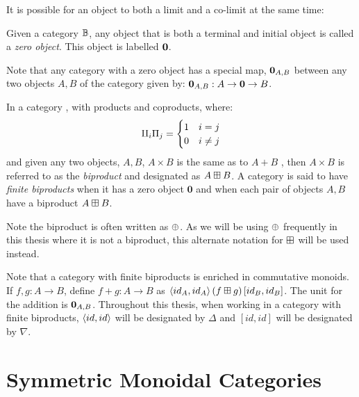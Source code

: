 It is possible for an object to both a limit and a co-limit at the same time:
\begin{definition}\label{def:categorical_zero}
  Given a category $\mathbb{B}$, any object that is both a terminal and initial object is called a
  \emph{zero object}. This object is labelled $\mathbf{0}$.
\end{definition}

Note that any category with a zero object has a special map, $\mathbf{0}_{A,B}$
between any two objects $A,B$ of the category given by: $\mathbf{0}_{A,B} : A \to \mathbf{0} \to B$.

\begin{definition}\label{def:categorical_biproduct}
  In a category \B, with products and coproducts, where:
  \[
    \amalg_{i}\Pi_j = \begin{cases}
      1 & i = j\\
      0 & i \neq j
      \end{cases}
  \]
  and given any two objects, $A,B$, $A\times B$ is the same as to $A+B$ , then $A\times B$ is
  referred to as the \emph{biproduct} and designated as $A\boxplus B$. A category \cD{} is said to
  have \emph{finite biproducts} when it has a zero object $\mathbf{0}$ and when each pair of objects
  $A,B$ have a biproduct $A\boxplus B$.

  Note the biproduct is often written  as $\oplus$. As we will be using $\oplus$ frequently in this thesis
  where it is not a biproduct, this alternate notation for $\boxplus$ will be used instead.
\end{definition}

Note that a category with finite biproducts is enriched in commutative monoids. If $f,g:A\to
B$, define $f+g:A\to B$ as $\langle id_{A}, id_{A}\rangle\, (f\boxplus g)\, [id_{B},id_{B}]$. The unit for the
addition is $\mathbf{0}_{A,B}$. Throughout this thesis, when working in a category with finite
biproducts, $\langle id, id\rangle$ will be designated by $\Delta$ and $[id,id]$ will be designated by
$\nabla$.



\section{Symmetric Monoidal Categories} %
\label{sub:categories_with_additional_structure}

